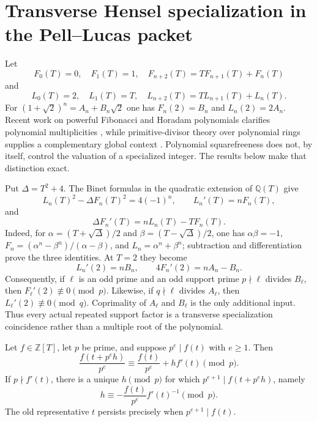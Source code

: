 \section{Transverse Hensel specialization in the Pell--Lucas packet}
\label{sec:pell-polynomial-hensel}

Let
\[
 F_0(T)=0,\quad F_1(T)=1,\quad
 F_{n+2}(T)=T F_{n+1}(T)+F_n(T)
\]
and
\[
 L_0(T)=2,\quad L_1(T)=T,\quad
 L_{n+2}(T)=T L_{n+1}(T)+L_n(T).
\]
For $(1+\sqrt2)^n=A_n+B_n\sqrt2$ one has
$F_n(2)=B_n$ and $L_n(2)=2A_n$.  Recent work on powerful
Fibonacci and Horadam polynomials clarifies polynomial multiplicities
\cite{BatesEtAl2026PowerfulFibonacci}, while primitive-divisor theory over
polynomial rings supplies a complementary global context
\cite{CeraDaConceicao2025PrimitiveDivisors}.  Polynomial squarefreeness does
not, by itself, control the valuation of a specialized integer.  The results
below make that distinction exact.

Put $\Delta=T^2+4$.  The Binet formulas in the quadratic extension of
$\mathbb Q(T)$ give
\begin{equation}
 L_n(T)^2-\Delta F_n(T)^2=4(-1)^n,
 \qquad L_n'(T)=nF_n(T),
 \label{eq:pell-polynomial-norm-derivative}
\end{equation}
and
\begin{equation}
 \Delta F_n'(T)=nL_n(T)-TF_n(T).
 \label{eq:pell-polynomial-second-derivative}
\end{equation}
Indeed, for
$\alpha=(T+\sqrt\Delta)/2$ and $\beta=(T-\sqrt\Delta)/2$, one has
$\alpha\beta=-1$,
$F_n=(\alpha^n-\beta^n)/(\alpha-\beta)$, and
$L_n=\alpha^n+\beta^n$; subtraction and differentiation prove the three
identities.  At $T=2$ they become
\[
 L_n'(2)=nB_n,\qquad 4F_n'(2)=nA_n-B_n.
\]
Consequently, if $\ell$ is an odd prime and an odd support prime
$p\nmid\ell$ divides $B_\ell$, then $F_\ell'(2)\not\equiv0\pmod p$.
Likewise, if $q\nmid\ell$ divides $A_\ell$, then
$L_\ell'(2)\not\equiv0\pmod q$.  Coprimality of $A_\ell$ and $B_\ell$
is the only additional input.  Thus every actual repeated support factor is
a transverse specialization coincidence rather than a multiple root of the
polynomial.

\begin{lemma}
\label{lem:pell-hensel-displacement}
Let $f\in\mathbb Z[T]$, let $p$ be prime, and suppose $p^e\mid f(t)$ with
$e\ge1$.  Then
\[
 \frac{f(t+p^eh)}{p^e}\equiv
 \frac{f(t)}{p^e}+h f'(t)\pmod p.
\]
If $p\nmid f'(t)$, there is a unique $h\pmod p$ for which
$p^{e+1}\mid f(t+p^eh)$, namely
\[
 h\equiv-\frac{f(t)}{p^e}f'(t)^{-1}\pmod p.
\]
The old representative $t$ persists precisely when
$p^{e+1}\mid f(t)$.
\end{lemma}

